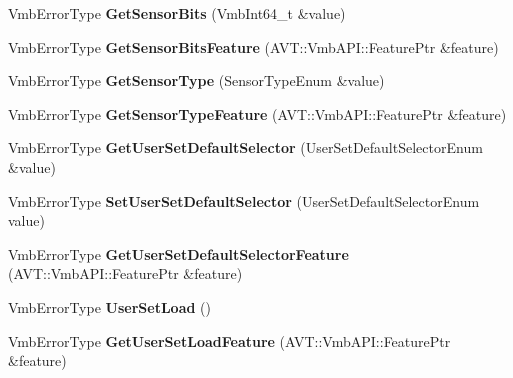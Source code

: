 \begin{DoxyCompactItemize}
\item 
\hypertarget{classMakoCamera_a9d7fac71b0e346c0e893be763a462497}{Vmb\-Error\-Type {\bfseries Get\-Sensor\-Bits} (Vmb\-Int64\-\_\-t \&value)}\label{classMakoCamera_a9d7fac71b0e346c0e893be763a462497}

\item 
\hypertarget{classMakoCamera_a51e52c5066a0e74e4c62da90fad0de24}{Vmb\-Error\-Type {\bfseries Get\-Sensor\-Bits\-Feature} (A\-V\-T\-::\-Vmb\-A\-P\-I\-::\-Feature\-Ptr \&feature)}\label{classMakoCamera_a51e52c5066a0e74e4c62da90fad0de24}

\item 
\hypertarget{classMakoCamera_a428f288f265d56ff1562f650b248997b}{Vmb\-Error\-Type {\bfseries Get\-Sensor\-Type} (Sensor\-Type\-Enum \&value)}\label{classMakoCamera_a428f288f265d56ff1562f650b248997b}

\item 
\hypertarget{classMakoCamera_aa10ba88092a674a7c445610275efd10b}{Vmb\-Error\-Type {\bfseries Get\-Sensor\-Type\-Feature} (A\-V\-T\-::\-Vmb\-A\-P\-I\-::\-Feature\-Ptr \&feature)}\label{classMakoCamera_aa10ba88092a674a7c445610275efd10b}

\item 
\hypertarget{classMakoCamera_af19a469107dbaf9d2391578435efc4b0}{Vmb\-Error\-Type {\bfseries Get\-User\-Set\-Default\-Selector} (User\-Set\-Default\-Selector\-Enum \&value)}\label{classMakoCamera_af19a469107dbaf9d2391578435efc4b0}

\item 
\hypertarget{classMakoCamera_af6e3d1f606d8c39620490b2a39d81b1b}{Vmb\-Error\-Type {\bfseries Set\-User\-Set\-Default\-Selector} (User\-Set\-Default\-Selector\-Enum value)}\label{classMakoCamera_af6e3d1f606d8c39620490b2a39d81b1b}

\item 
\hypertarget{classMakoCamera_a592a7f5e43fd6e0dc5da8c8ce778ba8d}{Vmb\-Error\-Type {\bfseries Get\-User\-Set\-Default\-Selector\-Feature} (A\-V\-T\-::\-Vmb\-A\-P\-I\-::\-Feature\-Ptr \&feature)}\label{classMakoCamera_a592a7f5e43fd6e0dc5da8c8ce778ba8d}

\item 
\hypertarget{classMakoCamera_a2ee58452c412f8c39ee0c42c8ab86bd9}{Vmb\-Error\-Type {\bfseries User\-Set\-Load} ()}\label{classMakoCamera_a2ee58452c412f8c39ee0c42c8ab86bd9}

\item 
\hypertarget{classMakoCamera_a65faf272cf08d055500c01873ca8e6d7}{Vmb\-Error\-Type {\bfseries Get\-User\-Set\-Load\-Feature} (A\-V\-T\-::\-Vmb\-A\-P\-I\-::\-Feature\-Ptr \&feature)}\label{classMakoCamera_a65faf272cf08d055500c01873ca8e6d7}


\end{DoxyCompactItemize}
